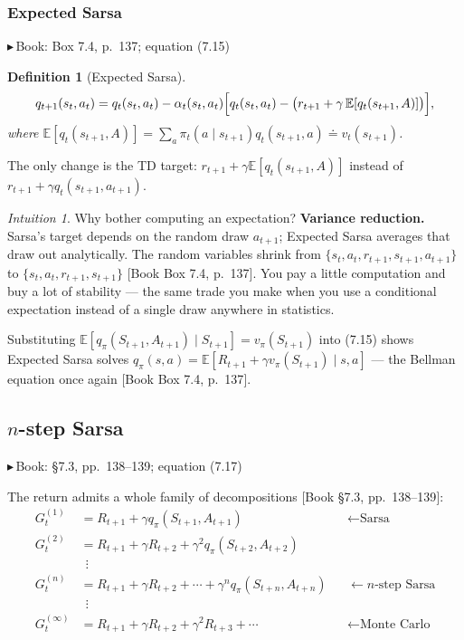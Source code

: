 \documentclass[11pt, letterpaper]{article}
\theoremstyle{runin}
\newtheorem*{definition}{Definition}
\theoremstyle{runinplain}
\theoremstyle{remark}
\newtheorem*{intuition}{Intuition}
\newcommand{\E}{\mathbb{E}}
\newcommand{\bk}[1]{{\color{bookblue}\small$\blacktriangleright$\,\textsf{Book: #1}}}
\newcommand{\bkin}[1]{{\color{bookblue}\small[\textsf{Book #1}]}}
\begin{document}
\subsubsection{Expected Sarsa}

\bk{Box 7.4, p.~137; equation (7.15)}

\begin{definition}[Expected Sarsa]
\[
  q_{t+1}(s_t,a_t)=q_t(s_t,a_t)-\alpha_t(s_t,a_t)
    \Bigl[q_t(s_t,a_t)-\bigl(r_{t+1}+\gamma\,\E[q_t(s_{t+1},A)]\bigr)\Bigr],
\]
where
$\E[q_t(s_{t+1},A)]=\sum_a\pi_t(a\mid s_{t+1})q_t(s_{t+1},a)\doteq v_t(s_{t+1})$.
\end{definition}

The only change is the TD target: $r_{t+1}+\gamma\E[q_t(s_{t+1},A)]$ instead of
$r_{t+1}+\gamma q_t(s_{t+1},a_{t+1})$.

\begin{intuition}
Why bother computing an expectation? \textbf{Variance reduction.} Sarsa's target
depends on the random draw $a_{t+1}$; Expected Sarsa averages that draw out
analytically. The random variables shrink from
$\{s_t,a_t,r_{t+1},s_{t+1},a_{t+1}\}$ to $\{s_t,a_t,r_{t+1},s_{t+1}\}$
\bkin{Box 7.4, p.~137}. You pay a little computation and buy a lot of stability ---
the same trade you make when you use a conditional expectation instead of a single
draw anywhere in statistics.
\end{intuition}

Substituting $\E[q_\pi(S_{t+1},A_{t+1})\mid S_{t+1}]=v_\pi(S_{t+1})$ into (7.15)
shows Expected Sarsa solves
$q_\pi(s,a)=\E[R_{t+1}+\gamma v_\pi(S_{t+1})\mid s,a]$ --- the Bellman equation once
again \bkin{Box 7.4, p.~137}.

\subsection{$n$-step Sarsa}

\bk{\S7.3, pp.~138--139; equation (7.17)}

The return admits a whole family of decompositions \bkin{\S7.3, pp.~138--139}:
\[
\begin{aligned}
  G_t^{(1)}&=R_{t+1}+\gamma q_\pi(S_{t+1},A_{t+1}) &&\longleftarrow\text{Sarsa}\\
  G_t^{(2)}&=R_{t+1}+\gamma R_{t+2}+\gamma^2q_\pi(S_{t+2},A_{t+2})\\
  &\ \ \vdots\\
  G_t^{(n)}&=R_{t+1}+\gamma R_{t+2}+\cdots+\gamma^nq_\pi(S_{t+n},A_{t+n})
    &&\longleftarrow n\text{-step Sarsa}\\
  &\ \ \vdots\\
  G_t^{(\infty)}&=R_{t+1}+\gamma R_{t+2}+\gamma^2R_{t+3}+\cdots
    &&\longleftarrow\text{Monte Carlo}
\end{aligned}
\]
\end{document}
